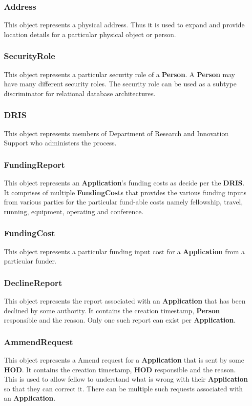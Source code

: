 \documentclass[12pt]{article}
\begin{document}
\subsubsection{Address}
This object represents a physical address. Thus it is used to expand and provide location details for a particular physical object or person.  

\subsubsection{SecurityRole}
This object represents a particular security role of a \textbf{Person}. A \textbf{Person} may have many different security roles. The security role can be used as a subtype discriminator for relational database architectures.

\subsubsection{DRIS}
This object represents members of Department of Research and Innovation Support who administers the process.

\subsubsection{FundingReport}
This object represents an \textbf{Application}'s funding costs as decide per the \textbf{DRIS}. It comprises of multiple \textbf{FundingCost}s that provides the various funding inputs from various parties for the particular fund-able costs namely fellowship, travel, running, equipment, operating
and conference.
 
\subsubsection{FundingCost}
This object represents a particular funding input cost for a \textbf{Application} from a particular funder. 

\subsubsection{DeclineReport}
This object represents the report associated with an \textbf{Application} that has been declined by some authority. It contains the creation timestamp, \textbf{Person} responsible and the reason. Only one such report can exist per \textbf{Application}.

\subsubsection{AmmendRequest}
This object represents a Amend request for a \textbf{Application} that is sent by some \textbf{HOD}. It contains the creation timestamp, \textbf{HOD} responsible and the reason. This is used to allow fellow to understand what is wrong with their \textbf{Application} so that they can correct it. There can be multiple such requests associated with an \textbf{Application}.
\end{document}
